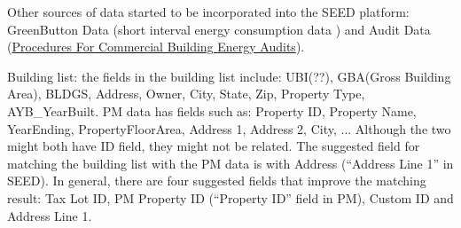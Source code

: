 \documentclass[12pt]{article}
\begin{document}
\begin{enumerate}
  Other sources of data started to be incorporated into the SEED
  platform: GreenButton Data (short interval energy consumption data )
  and Audit Data
  (\href{https://www.ashrae.org/resources--publications/bookstore/procedures-for-commercial-building-energy-audits}{Procedures
    For Commercial Building Energy Audits}).

  Building list: the fields in the building list include: UBI(??),
  GBA(Gross Building Area), BLDGS, Address, Owner, City, State, Zip,
  Property Type, AYB\_YearBuilt. PM data has fields such as: Property
  ID, Property Name, YearEnding, PropertyFloorArea, Address 1, Address
  2, City, ... Although the two might both have ID field, they might
  not be related. The suggested field for matching the building list
  with the PM data is with Address (``Address Line 1'' in SEED). In
  general, there are four suggested fields that improve the matching
  result: Tax Lot ID, PM Property ID (``Property ID'' field in PM),
  Custom ID and Address Line 1.
  
\end{enumerate}
\newpage


\end{document}
